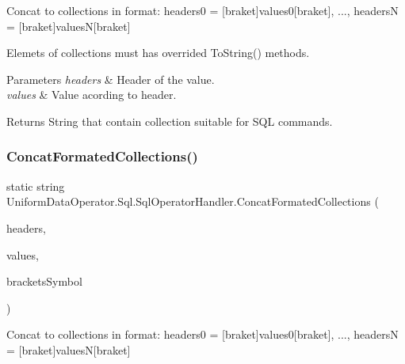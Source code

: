 Concat to collections in format\+: headers0 = \mbox{[}braket\mbox{]}values0\mbox{[}braket\mbox{]}, ..., headersN = \mbox{[}braket\mbox{]}valuesN\mbox{[}braket\mbox{]} 

Elemets of collections must has overrided To\+String() methods. 


\begin{DoxyParams}{Parameters}
{\em headers} & Header of the value.\\
\hline
{\em values} & Value acording to header.\\
\hline
\end{DoxyParams}
\begin{DoxyReturn}{Returns}
String that contain collection suitable for S\+QL commands.
\end{DoxyReturn}
\mbox{\label{class_uniform_data_operator_1_1_sql_1_1_sql_operator_handler_ac17e36b29fe5a17281927ab04dbeab26}} 
\subsubsection{\texorpdfstring{Concat\+Formated\+Collections()}{ConcatFormatedCollections()}\hspace{0.1cm}{\footnotesize\ttfamily [2/2]}}
{\footnotesize\ttfamily static string Uniform\+Data\+Operator.\+Sql.\+Sql\+Operator\+Handler.\+Concat\+Formated\+Collections (\begin{DoxyParamCaption}\item[{I\+Enumerable$<$ object $>$}]{headers,  }\item[{I\+Enumerable$<$ object $>$}]{values,  }\item[{char}]{brackets\+Symbol }\end{DoxyParamCaption})\hspace{0.3cm}{\ttfamily [static]}}



Concat to collections in format\+: headers0 = \mbox{[}braket\mbox{]}values0\mbox{[}braket\mbox{]}, ..., headersN = \mbox{[}braket\mbox{]}valuesN\mbox{[}braket\mbox{]} 


